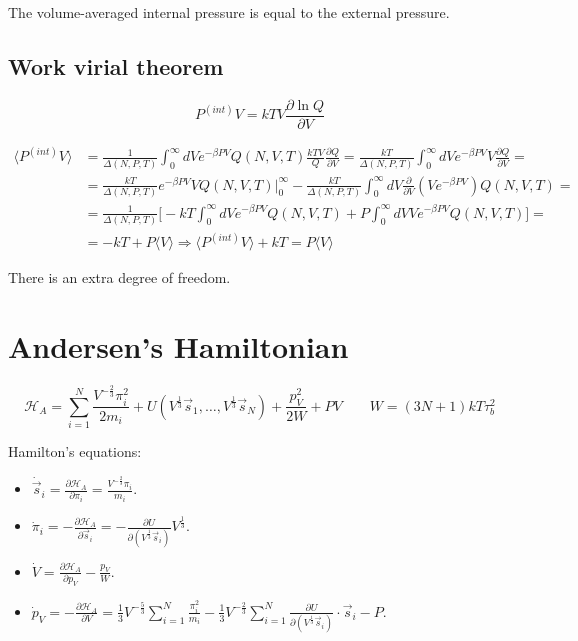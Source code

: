 	The volume-averaged internal pressure is equal to the external pressure.

	\subsection{Work virial theorem}

	$$P^{(int)}V = kTV\frac{\partial \ln Q}{\partial V}$$

	\begin{align*}
		\langle P^{(int)}V\rangle &= \frac{1}{\Delta(N, P, T)}\int_0^{\infty}dVe^{-\beta PV}Q(N, V, T)\frac{kTV}{Q}\frac{\partial Q}{\partial V} = \frac{kT}{\Delta(N, P, T)}\int_0^{\infty}dVe^{-\beta PV}V\frac{\partial Q}{\partial V} = \\
															&=\frac{kT}{\Delta(N, P, T)}e^{-\beta PV}VQ(N, V, T)|_{0}^{\infty}-\frac{kT}{\Delta(N, P, T)}\int_0^{\infty}dV\frac{\partial}{\partial V}(Ve^{-\beta PV})Q(N, V, T)=\\
															&= \frac{1}{\Delta(N, P, T)}\biggl[-kT\int_0^{\infty}dVe^{-\beta PV}Q(N, V, T) + P\int_0^{\infty}dVVe^{-\beta PV}Q(N, V, T)\biggr]=\\
															&=-kT+P\langle V\rangle \Rightarrow \langle P^{(int)}V\rangle + kT = P\langle V\rangle
	\end{align*}

	There is an extra degree of freedom.

\section{Andersen's Hamiltonian}

$$\mathcal{H}_A = \sum\limits_{i=1}^N\frac{V^{-\frac{2}{3}}\pi_i^2}{2m_i}+ U(V^\frac{1}{3}\vec{s}_1, \dots, V^{\frac{1}{3}}\vec{s}_N) + \frac{p_V^2}{2W} + PV\qquad W = (3N+1)kT\tau_b^2$$

Hamilton's equations:

\begin{itemize}
	\item $\dot{\vec{s}}_i = \frac{\partial \mathcal{H}_A}{\partial\pi_i} = \frac{V^{-\frac{2}{3}}\pi_i}{m_i}$.
	\item $\dot{\pi}_i = -\frac{\partial\mathcal{H}_A}{\partial\vec{s}_i} = -\frac{\partial U}{\partial (V^{\frac{1}{3}}\vec{s}_i)}V^{\frac{1}{3}}$.
	\item $\dot{V} = \frac{\partial\mathcal{H}_A}{\partial p_V}-\frac{p_V}{W}$.
	\item $\dot{p}_V = -\frac{\partial\mathcal{H}_A}{\partial V} = \frac{1}{3}V^{-\frac{5}{3}}\sum\limits_{i=1}^N\frac{\pi_i^2}{m_i}-\frac{1}{3}V^{-\frac{2}{3}}\sum\limits_{i=1}^N\frac{\partial U}{\partial(V^{\frac{1}{3}}\vec{s}_i)}\cdot\vec{s}_i-P$.
\end{itemize}

